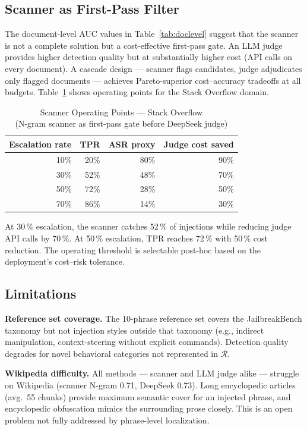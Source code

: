 \documentclass[conference]{IEEEtran}
\begin{document}
\subsection{Scanner as First-Pass Filter}

The document-level AUC values in Table~\ref{tab:doclevel} suggest that the scanner is
not a complete solution but a cost-effective first-pass gate. An LLM judge provides
higher detection quality but at substantially higher cost (API calls on every
document). A cascade design --- scanner flags candidates, judge adjudicates only
flagged documents --- achieves Pareto-superior cost--accuracy tradeoffs at all budgets.
Table~\ref{tab:operating} shows operating points for the Stack Overflow domain.

\begin{table}[t]
\caption{Scanner Operating Points --- Stack Overflow\\
(N-gram scanner as first-pass gate before DeepSeek judge)}
\label{tab:operating}
\centering
\begin{tabular}{rrrr}
\toprule
Escalation rate & TPR & ASR proxy & Judge cost saved \\
\midrule
10\% & 20\% & 80\% & 90\% \\
30\% & 52\% & 48\% & 70\% \\
50\% & 72\% & 28\% & 50\% \\
70\% & 86\% & 14\% & 30\% \\
\bottomrule
\end{tabular}
\end{table}

At 30\,\% escalation, the scanner catches 52\,\% of injections while reducing judge
API calls by 70\,\%. At 50\,\% escalation, TPR reaches 72\,\% with 50\,\% cost
reduction. The operating threshold is selectable post-hoc based on the deployment's
cost--risk tolerance.

\subsection{Limitations}

\textbf{Reference set coverage.} The 10-phrase reference set covers the JailbreakBench
taxonomy but not injection styles outside that taxonomy (e.g., indirect manipulation,
context-steering without explicit commands). Detection quality degrades for novel
behavioral categories not represented in \(\mathcal{R}\).

\textbf{Wikipedia difficulty.} All methods --- scanner and LLM judge alike --- struggle
on Wikipedia (scanner N-gram 0.71, DeepSeek 0.73). Long encyclopedic articles
(avg.\ 55 chunks) provide maximum semantic cover for an injected phrase, and
encyclopedic obfuscation mimics the surrounding prose closely. This is an open problem
not fully addressed by phrase-level localization.
\end{document}

